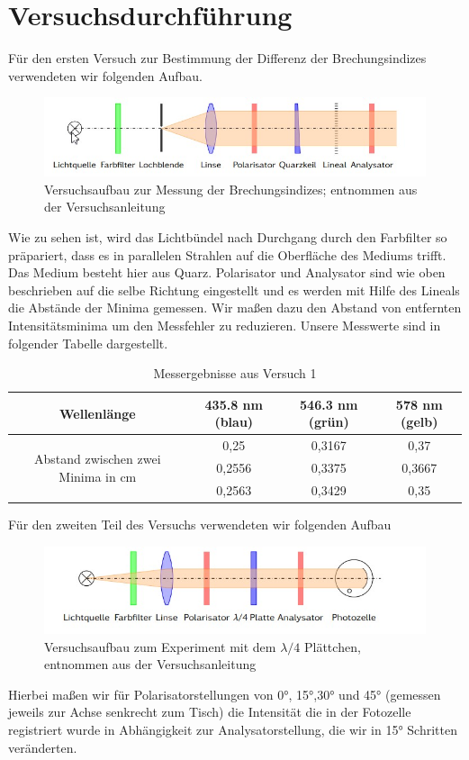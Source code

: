 \documentclass[a4paper, 12pt,]{scrartcl}
\begin{document}
\section{Versuchsdurchführung}
Für den ersten Versuch zur Bestimmung der Differenz der Brechungsindizes verwendeten wir folgenden Aufbau.
\begin{figure}[H]\centering\includegraphics[scale=0.8]{Aufbau V1}\caption{Versuchsaufbau zur Messung der Brechungsindizes; entnommen aus der Versuchsanleitung}\end{figure}
Wie zu sehen ist, wird das Lichtbündel nach Durchgang durch den Farbfilter so präpariert, dass es in parallelen Strahlen auf die Oberfläche des Mediums trifft. Das Medium besteht hier aus Quarz. Polarisator und Analysator sind wie oben beschrieben auf die selbe Richtung eingestellt und es werden mit Hilfe des Lineals die Abstände der Minima gemessen. Wir maßen dazu den Abstand von entfernten Intensitätsminima um den Messfehler zu reduzieren. Unsere Messwerte sind in folgender Tabelle dargestellt.
\begin{table}[H]\centering\begin{tabular}{c  |c  |c |c }Wellenlänge&435.8 nm (blau)&546.3 nm (grün)&578 nm (gelb)\\\hline\multirow{3}{3cm}{Abstand zwischen zwei Minima in cm}&0,25&0,3167&0,37\\&0,2556&0,3375&0,3667\\&0,2563&0,3429&0,35\end{tabular}\caption{Messergebnisse aus Versuch 1}\end{table}
Für den zweiten Teil des Versuchs verwendeten wir folgenden Aufbau
\begin{figure}[H]\centering\includegraphics[scale=0.8]{Aufbau V2}\caption{Versuchsaufbau zum Experiment mit dem 
$\lambda/4$ Plättchen, entnommen aus der Versuchsanleitung}\end{figure}
Hierbei maßen wir für Polarisatorstellungen von 0°, 15°,30° und 45° (gemessen jeweils zur Achse senkrecht zum Tisch) die Intensität die in der Fotozelle registriert wurde in Abhängigkeit zur Analysatorstellung, die wir in 15° Schritten veränderten.
\end{document}
